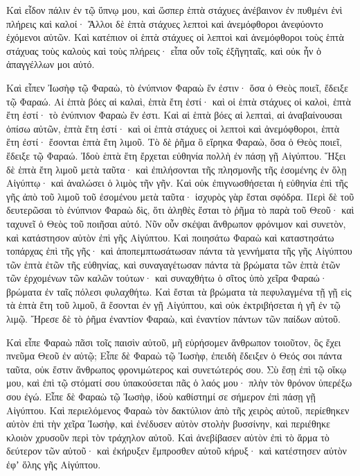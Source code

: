 {Καὶ εἶδον πάλιν ἐν τῷ ὕπνῳ μου, καὶ ὥσπερ ἑπτὰ στάχυες ἀνέβαινον ἐν πυθμένι ἑνὶ πλήρεις καὶ καλοί·
Ἄλλοι δὲ ἑπτὰ στάχυες λεπτοὶ καὶ ἀνεμόφθοροι ἀνεφύοντο ἐχόμενοι αὐτῶν.
Καὶ κατέπιον οἱ ἑπτὰ στάχυες οἱ λεπτοὶ καὶ ἀνεμόφθοροι τοὺς ἑπτὰ στάχυας τοὺς καλοὺς καὶ τοὺς πλήρεις· εἶπα οὖν τοῖς ἐξῆγηταῖς, καὶ οὐκ ἦν ὁ ἀπαγγέλλων μοι αὐτό.
\par }{\PP {}Καὶ εἶπεν Ἰωσὴφ τῷ Φαραὼ, τὸ ἐνύπνιον Φαραὼ ἕν ἐστιν· ὅσα ὁ Θεὸς ποιεῖ, ἔδειξε τῷ Φαραώ.
Αἱ ἑπτὰ βόες αἱ καλαὶ, ἑπτὰ ἔτη ἐστί· καὶ οἱ ἑπτὰ στάχυες οἱ καλοὶ, ἑπτὰ ἔτη ἐστί· τὸ ἐνύπνιον Φαραὼ ἕν ἐστι.
Καὶ αἱ ἑπτὰ βόες αἱ λεπταὶ, αἱ ἀναβαίνουσαι ὀπίσω αὐτῶν, ἑπτὰ ἔτη ἐστί· καὶ οἱ ἑπτὰ στάχυες οἱ λεπτοὶ καὶ ἀνεμόφθοροι, ἑπτὰ ἔτη ἐστί· ἔσονται ἑπτὰ ἔτη λιμοῦ.
Τὸ δὲ ῥῆμα ὃ εἴρηκα Φαραὼ, ὅσα ὁ Θεὸς ποιεῖ, ἔδειξε τῷ Φαραώ.
Ἰδοὺ ἑπτὰ ἔτη ἔρχεται εὐθηνία πολλὴ ἐν πάσῃ γῇ Αἰγύπτου.
Ἥξει δὲ ἑπτὰ ἔτη λιμοῦ μετὰ ταῦτα· καὶ ἐπιλήσονται τῆς πλησμονῆς τῆς ἐσομένης ἐν ὅλῃ Αἰγύπτῳ· καὶ ἀναλώσει ὁ λιμὸς τῆν γῆν.
Καὶ οὐκ ἐπιγνωσθήσεται ἡ εὐθηνία ἐπὶ τῆς γῆς ἀπὸ τοῦ λιμοῦ τοῦ ἐσομένου μετὰ ταῦτα· ἰσχυρὸς γὰρ ἔσται σφόδρα.
Περὶ δὲ τοῦ δευτερῶσαι τὸ ἐνύπνιον Φαραὼ δὶς, ὅτι ἀληθὲς ἔσται τὸ ῥῆμα τὸ παρὰ τοῦ Θεοῦ· καὶ ταχυνεῖ ὁ Θεὸς τοῦ ποιῆσαι αὐτό.
Νῦν οὖν σκέψαι ἄνθρωπον φρόνιμον καὶ συνετὸν, καὶ κατάστησον αὐτὸν ἐπὶ γῆς Αἰγύπτου.
Καὶ ποιησάτω Φαραὼ καὶ καταστησάτω τοπάρχας ἐπὶ τῆς γῆς· καὶ ἀποπεμπτωσάτωσαν πάντα τὰ γεννήματα τῆς γῆς Αἰγύπτου τῶν ἑπτὰ ἐτῶν τῆς εὐθηνίας,
καὶ συναγαγέτωσαν πάντα τὰ βρώματα τῶν ἑπτὰ ἐτῶν τῶν ἐρχομένων τῶν καλῶν τούτων· καὶ συναχθήτω ὁ σῖτος ὑπὸ χεῖρα Φαραώ· βρώματα ἐν ταῖς πόλεσι φυλαχθήτω.
Καὶ ἔσται τὰ βρώματα τὰ πεφυλαγμένα τῇ γῇ εἰς τὰ ἑπτὰ ἔτη τοῦ λιμοῦ, ἃ ἔσονται ἐν γῇ Αἰγύπτου, καὶ οὐκ ἐκτριβήσεται ἡ γῆ ἐν τῷ λιμῷ.
Ἤρεσε δὲ τὸ ῥῆμα ἐναντίον Φαραὼ, καὶ ἐναντίον πάντων τῶν παίδων αὐτοῦ.
\par }{\PP {}Καὶ εἶπε Φαραὼ πᾶσι τοῖς παισὶν αὐτοῦ, μῆ εὑρήσομεν ἄνθρωπον τοιοῦτον, ὃς ἔχει πνεῦμα Θεοῦ ἐν αὐτῷ;
Εἶπε δὲ Φαραὼ τῷ Ἰωσὴφ, ἐπειδὴ ἔδειξεν ὁ Θεός σοι πάντα ταῦτα, οὐκ ἔστιν ἄνθρωπος φρονιμώτερος καὶ συνετώτερός σου.
Σὺ ἔσῃ ἐπὶ τῷ οἴκῳ μου, καὶ ἐπὶ τῷ στόματί σου ὑπακούσεται πᾶς ὁ λαός μου· πλὴν τὸν θρόνον ὑπερέξω σου ἐγώ.
Εἶπε δὲ Φαραὼ τῷ Ἰωσὴφ, ἰδοὺ καθίστημί σε σήμερον ἐπὶ πάσῃ γῇ Αἰγύπτου.
Καὶ περιελόμενος Φαραὼ τὸν δακτύλιον ἀπὸ τῆς χειρὸς αὐτοῦ, περίεθηκεν αὐτὸν ἐπὶ τὴν χεῖρα Ἰωσὴφ, καὶ ἐνέδυσεν αὐτὸν στολὴν βυσσίνην, καὶ περιέθηκε κλοιὸν χρυσοῦν περὶ τὸν τράχηλον αὐτοῦ.
Καὶ ἀνεβίβασεν αὐτὸν ἐπὶ τὸ ἅρμα τὸ δεύτερον τῶν αὐτοῦ· καὶ ἐκήρυξεν ἔμπροσθεν αὐτοῦ κήρυξ· καὶ κατέστησεν αὐτὸν ἐφʼ ὅλης γῆς Αἰγύπτου.
}
